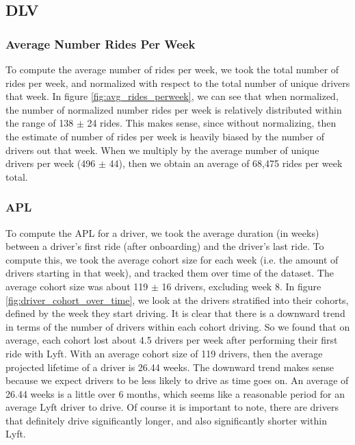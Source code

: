 \documentclass{report}
\begin{document}
	\subsection{DLV}
	\subsubsection{Average Number Rides Per Week}

		To compute the average number of rides per week, we took the total number of rides per week, and normalized with respect to the total number of unique drivers that week. In figure \ref{fig:avg_rides_perweek}, we can see that when normalized, the number of normalized number rides per week is relatively distributed within the range of 138 $\pm$ 24 rides. This makes sense, since without normalizing, then the estimate of number of rides per week is heavily biased by the number of drivers out that week. When we multiply by the average number of unique drivers per week (496 $\pm$ 44), then we obtain an average of 68,475 rides per week total.

	\subsubsection{APL}

		To compute the APL for a driver, we took the average duration (in weeks) between a driver's first ride (after onboarding) and the driver's last ride. To compute this, we took the average cohort size for each week (i.e. the amount of drivers starting in that week), and tracked them over time of the dataset. The average cohort size was about 119 $\pm$ 16 drivers, excluding week 8. In figure \ref{fig:driver_cohort_over_time}, we look at the drivers stratified into their cohorts, defined by the week they start driving. It is clear that there is a downward trend in terms of the number of drivers within each cohort driving. So we found that on average, each cohort lost about 4.5 drivers per week after performing their first ride with Lyft. With an average cohort size of 119 drivers, then the average projected lifetime of a driver is 26.44 weeks. The downward trend makes sense because we expect drivers to be less likely to drive as time goes on. An average of 26.44 weeks is a little over 6 months, which seems like a reasonable period for an average Lyft driver to drive. Of course it is important to note, there are drivers that definitely drive significantly longer, and also significantly shorter within Lyft.
\end{document}
